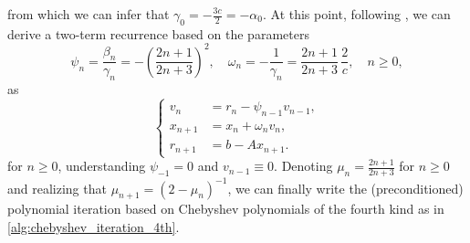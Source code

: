 \documentclass[a4paper]{article}
\theoremstyle{plain}
\theoremstyle{definition}
\theoremstyle{remark}
\begin{document}
from which we can infer that \(\gamma_0 = -\frac{3c}{2} = - \alpha_0\). At this point, following \cite[Section~5]{Gutknecht2002}, we can derive a two-term recurrence based on the parameters
\begin{equation*}
	\psi_n = \frac{\beta_n}{\gamma_n} = - \left(\frac{2n+1}{2n+3}\right)^2, \quad \omega_n = - \frac{1}{\gamma_n} = \frac{2n+1}{2n+3}\, \frac{2}{c}, \quad n\geq 0,
\end{equation*}
as
\begin{equation*}
	\left\{
	\begin{aligned}
		v_n &= r_n - \psi_{n-1} v_{n-1},\\
		x_{n+1} &= x_n + \omega_n v_{n},\\
		r_{n+1} &= b - A x_{n+1}.
	\end{aligned}
	\right.
\end{equation*}
for \(n \geq 0\), understanding \(\psi_{-1} = 0\) and \(v_{n-1}\equiv 0\). Denoting \(\mu_n = \frac{2n+1}{2n+3}\) for \(n \geq 0\) and realizing that \(\mu_{n+1} = (2 - \mu_{n})^{-1}\), we can finally write the (preconditioned) polynomial iteration based on Chebyshev polynomials of the fourth kind as in \cref{alg:chebyshev_iteration_4th}.

\begin{algorithm}[!htb]
	\caption{Chebyshev iteration of the fourth kind}\label{alg:chebyshev_iteration_4th}
	\begin{algorithmic}[1]

        \vspace{1em}


        \vspace{1em}


        \vspace{1em}

		

		
		\EndFor

        \vspace{1em}

	\end{algorithmic}
\end{algorithm}
\end{document}

